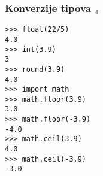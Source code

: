 \documentclass[utf8,compress]{beamer}
\begin{document}

\begin{frame}[fragile]
  \frametitle{Konverzije tipova $_4$}
\begin{verbatim}
>>> float(22/5)
4.0
>>> int(3.9)
3
>>> round(3.9)
4.0
>>> import math
>>> math.floor(3.9)
3.0
>>> math.floor(-3.9)
-4.0
>>> math.ceil(3.9)
4.0
>>> math.ceil(-3.9)
-3.0
\end{verbatim}
\end{frame}
\end{document}
